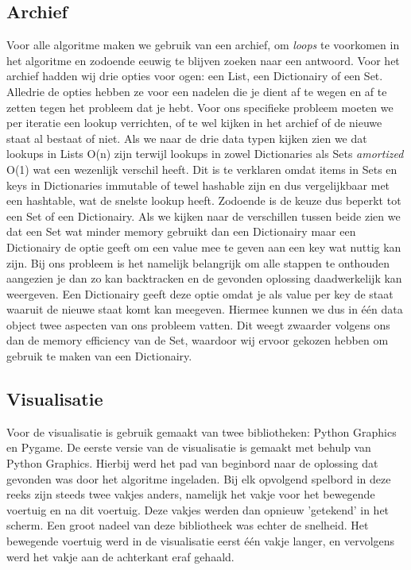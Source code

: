 \documentclass[a4paper]{article}
\begin{document}
\subsection{Archief}
Voor alle algoritme maken we gebruik van een archief, om \textit{loops} te voorkomen in het algoritme en zodoende eeuwig te blijven zoeken naar een antwoord. Voor het archief hadden wij drie opties voor ogen: een List, een Dictionairy of een Set. Alledrie de opties hebben ze voor een nadelen die je dient af te wegen en af te zetten tegen het probleem dat je hebt. Voor ons specifieke probleem moeten we per iteratie een lookup verrichten, of te wel kijken in het archief of de nieuwe staat al bestaat of niet. Als we naar de drie data typen kijken zien we dat lookups in Lists O(n) zijn terwijl lookups in zowel Dictionaries als Sets \textit{amortized} O(1) wat een wezenlijk verschil heeft. Dit is te verklaren omdat items in Sets en keys in Dictionaries immutable of tewel hashable zijn en dus vergelijkbaar met een hashtable, wat de snelste lookup heeft. Zodoende is de keuze dus beperkt tot een Set of een Dictionairy. Als we kijken naar de verschillen tussen beide zien we dat een Set wat minder memory gebruikt dan een Dictionairy maar een Dictionairy de optie geeft om een value mee te geven aan een key wat nuttig kan zijn. Bij ons probleem is het namelijk belangrijk om alle stappen te onthouden aangezien je dan zo kan backtracken en de gevonden oplossing daadwerkelijk kan weergeven. Een Dictionairy geeft deze optie omdat je als value per key de staat waaruit de nieuwe staat komt kan meegeven. Hiermee kunnen we dus in één data object twee aspecten van ons probleem vatten. Dit weegt zwaarder volgens ons dan de memory efficiency van de Set, waardoor wij ervoor gekozen hebben om gebruik te maken van een Dictionairy.

\subsection{Visualisatie}
Voor de visualisatie is gebruik gemaakt van twee bibliotheken: Python Graphics en Pygame. De eerste versie van de visualisatie is gemaakt met behulp van Python Graphics. Hierbij werd het pad van beginbord naar de oplossing dat gevonden was door het algoritme ingeladen. Bij elk opvolgend spelbord in deze reeks zijn steeds twee vakjes anders, namelijk het vakje voor het bewegende voertuig en na dit voertuig. Deze vakjes werden dan opnieuw 'getekend' in het scherm. Een groot nadeel van deze bibliotheek was echter de snelheid. Het bewegende voertuig werd in de visualisatie eerst één vakje langer, en vervolgens werd het vakje aan de achterkant eraf gehaald. 
	
\end{document}
